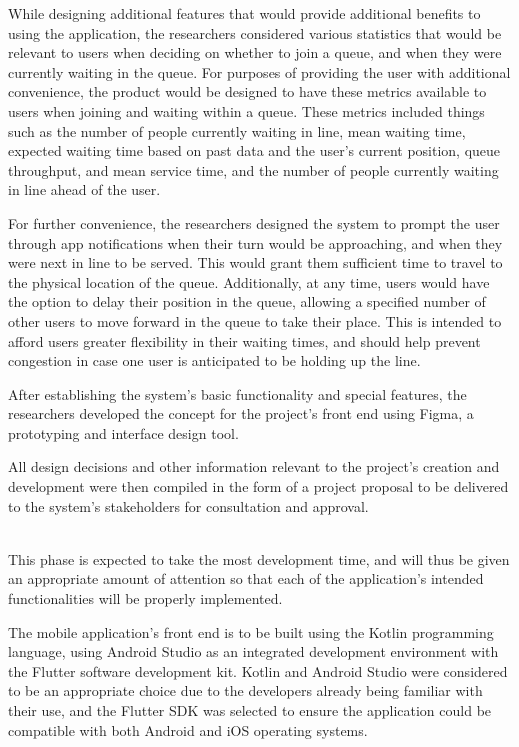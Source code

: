 While designing additional features that would provide additional benefits to using the application, the researchers considered various statistics that would be relevant to users when deciding on whether to join a queue, and when they were currently waiting in the queue. For purposes of providing the user with additional convenience, the product would be designed to have these metrics available to users when joining and waiting within a queue. These metrics included things such as the number of people currently waiting in line, mean waiting time, expected waiting time based on past data and the user’s current position, queue throughput, and mean service time, and the number of people currently waiting in line ahead of the user.

For further convenience, the researchers designed the system to prompt the user through app notifications when their turn would be approaching, and when they were next in line to be served. This would grant them sufficient time to travel to the physical location of the queue. Additionally, at any time, users would have the option to delay their position in the queue, allowing a specified number of other users to move forward in the queue to take their place. This is intended to afford users greater flexibility in their waiting times, and should help prevent congestion in case one user is anticipated to be holding up the line.

After establishing the system’s basic functionality and special features, the researchers developed the concept for the project’s front end using Figma, a prototyping and interface design tool.

All design decisions and other information relevant to the project’s creation and development were then compiled in the form of a project proposal to be delivered to the system’s stakeholders for consultation and approval.

 \\

This phase is expected to take the most development time, and will thus be given an appropriate amount of attention so that each of the application’s intended functionalities will be properly implemented.

The mobile application’s front end is to be built using the Kotlin programming language, using Android Studio as an integrated development environment with the Flutter software development kit. Kotlin and Android Studio were considered to be an appropriate choice due to the developers already being familiar with their use, and the Flutter SDK was selected to ensure the application could be compatible with both Android and iOS operating systems.

